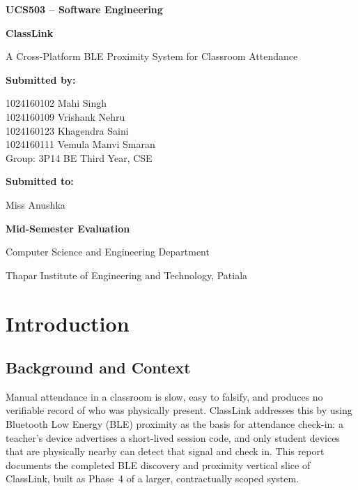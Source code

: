 \documentclass[12pt,a4paper]{report}
\begin{document}
\begin{titlepage}
\centering
\vspace*{1cm}
{\Large \textbf{UCS503 -- Software Engineering}\par}
\vspace{1.5cm}
{\Huge \textbf{ClassLink}\par}
\vspace{0.4cm}
{\large A Cross-Platform BLE Proximity System for Classroom Attendance\par}
\vspace{2cm}

{\Large \textbf{Submitted by:}\par}
\vspace{0.4cm}
1024160102 \; Mahi Singh\\[2pt]
1024160109 \; Vrishank Nehru\\[2pt]
1024160123 \; Khagendra Saini\\[2pt]
1024160111 \; Vemula Manvi Smaran\\[6pt]
Group: 3P14 \quad BE Third Year, CSE

\vspace{1.5cm}
{\Large \textbf{Submitted to:}\par}
\vspace{0.4cm}
Miss Anushka

\vspace{1.2cm}
{\large \textbf{Mid-Semester Evaluation}\par}

\vfill
{\large Computer Science and Engineering Department\par}
Thapar Institute of Engineering and Technology, Patiala
\end{titlepage}

\tableofcontents
\clearpage

\chapter{Introduction}

\section{Background and Context}
Manual attendance in a classroom is slow, easy to falsify, and produces no verifiable record of who was physically present. ClassLink addresses this by using Bluetooth Low Energy (BLE) proximity as the basis for attendance check-in: a teacher's device advertises a short-lived session code, and only student devices that are physically nearby can detect that signal and check in. This report documents the completed BLE discovery and proximity vertical slice of ClassLink, built as Phase~4 of a larger, contractually scoped system.
\end{document}
